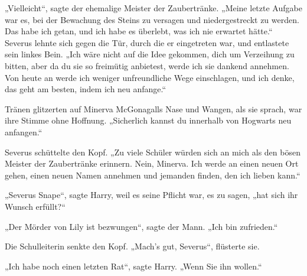 „Vielleicht“, sagte der ehemalige Meister der Zaubertränke.
„Meine letzte Aufgabe war es, bei der Bewachung des Steins zu versagen und niedergestreckt zu werden. Das habe ich getan, und ich habe es überlebt, was ich nie erwartet hätte.“ Severus lehnte sich gegen die Tür, durch die er eingetreten war, und entlastete sein linkes Bein.
„Ich wäre nicht auf die Idee gekommen, dich um Verzeihung zu bitten, aber da du sie so freimütig anbietest, werde ich sie dankend annehmen. Von heute an werde ich weniger unfreundliche Wege einschlagen, und ich denke, das geht am besten, indem ich neu anfange.“

Tränen glitzerten auf Minerva McGonagalls Nase und Wangen, als sie sprach, war ihre Stimme ohne Hoffnung.
„Sicherlich kannst du innerhalb von Hogwarts neu anfangen.“

Severus schüttelte den Kopf.
„Zu viele Schüler würden sich an mich als den bösen Meister der Zaubertränke erinnern. Nein, Minerva. Ich werde an einen neuen Ort gehen, einen neuen Namen annehmen und jemanden finden, den ich lieben kann.“

„Severus Snape“, sagte Harry, weil es seine Pflicht war, es zu sagen, „hat sich ihr Wunsch erfüllt?“

„Der Mörder von Lily ist bezwungen“, sagte der Mann.
„Ich bin zufrieden.“

Die Schulleiterin senkte den Kopf.
„Mach’s gut, Severus“, flüsterte sie.

„Ich habe noch einen letzten Rat“, sagte Harry.
„Wenn Sie ihn wollen.“

